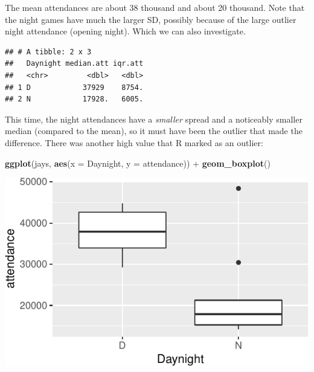 \documentclass[]{tufte-book}
\newenvironment{Shaded}{}{}
\newcommand{\DataTypeTok}[1]{\textcolor[rgb]{0.56,0.13,0.00}{#1}}
\newcommand{\KeywordTok}[1]{\textcolor[rgb]{0.00,0.44,0.13}{\textbf{#1}}}
\newcommand{\NormalTok}[1]{#1}
\newcommand{\OperatorTok}[1]{\textcolor[rgb]{0.40,0.40,0.40}{#1}}
\newcommand{\StringTok}[1]{\textcolor[rgb]{0.25,0.44,0.63}{#1}}
\theoremstyle{definition}
\theoremstyle{definition}
\theoremstyle{definition}
\theoremstyle{remark}
\begin{document}
The mean attendances are about 38 thousand and about 20 thousand. Note
that the night games have much the larger SD, possibly because of the
large outlier night attendance (opening night). Which we can also
investigate.

\begin{Shaded}
\end{Shaded}

\begin{verbatim}
## # A tibble: 2 x 3
##   Daynight median.att iqr.att
##   <chr>         <dbl>   <dbl>
## 1 D            37929    8754.
## 2 N            17928.   6005.
\end{verbatim}

This time, the night attendances have a \emph{smaller} spread and a
noticeably smaller median (compared to the mean), so it must have been
the outlier that made the difference. There was another high value that
R marked as an outlier:

\begin{Shaded}
\begin{Highlighting}[]
\KeywordTok{ggplot}\NormalTok{(jays, }\KeywordTok{aes}\NormalTok{(}\DataTypeTok{x =}\NormalTok{ Daynight, }\DataTypeTok{y =}\NormalTok{ attendance)) }\OperatorTok{+}\StringTok{ }
\StringTok{    }\KeywordTok{geom_boxplot}\NormalTok{()}
\end{Highlighting}
\end{Shaded}

\includegraphics{11-tidying-and-selecting-data_files/figure-latex/unnamed-chunk-11-1}
\end{document}
